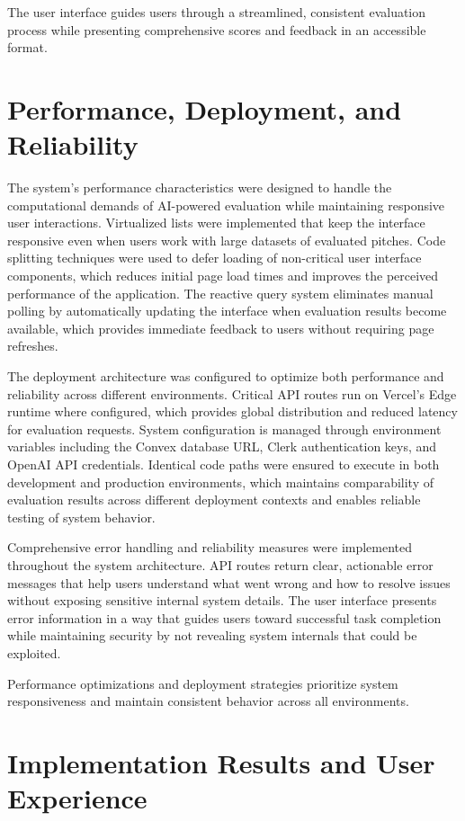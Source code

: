The user interface guides users through a streamlined, consistent evaluation process while presenting comprehensive scores and feedback in an accessible format.

\section{Performance, Deployment, and Reliability}

The system's performance characteristics were designed to handle the computational demands of AI-powered evaluation while maintaining responsive user interactions. Virtualized lists were implemented that keep the interface responsive even when users work with large datasets of evaluated pitches. Code splitting techniques were used to defer loading of non-critical user interface components, which reduces initial page load times and improves the perceived performance of the application. The reactive query system eliminates manual polling by automatically updating the interface when evaluation results become available, which provides immediate feedback to users without requiring page refreshes.

The deployment architecture was configured to optimize both performance and reliability across different environments. Critical API routes run on Vercel's Edge runtime where configured, which provides global distribution and reduced latency for evaluation requests. System configuration is managed through environment variables including the Convex database URL, Clerk authentication keys, and OpenAI API credentials. Identical code paths were ensured to execute in both development and production environments, which maintains comparability of evaluation results across different deployment contexts and enables reliable testing of system behavior.

Comprehensive error handling and reliability measures were implemented throughout the system architecture. API routes return clear, actionable error messages that help users understand what went wrong and how to resolve issues without exposing sensitive internal system details. The user interface presents error information in a way that guides users toward successful task completion while maintaining security by not revealing system internals that could be exploited.

Performance optimizations and deployment strategies prioritize system responsiveness and maintain consistent behavior across all environments.

\section{Implementation Results and User Experience}\label{sec:results}

